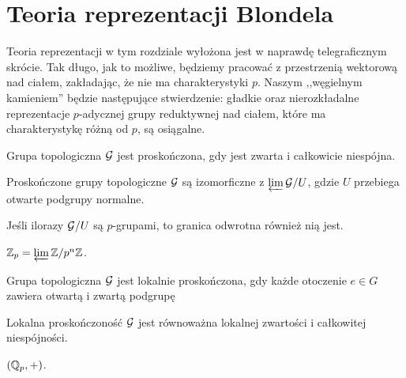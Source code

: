 \section{Teoria reprezentacji Blondela}
Teoria reprezentacji w tym rozdziale wyłożona jest w naprawdę telegraficznym skrócie.
Tak długo, jak to możliwe, będziemy pracować z przestrzenią wektorową nad ciałem, zakładając, że nie ma charakterystyki $p$.
Naszym ,,węgielnym kamieniem'' będzie następujące stwierdzenie: gładkie oraz nierozkładalne reprezentacje $p$-adycznej grupy reduktywnej nad ciałem, które ma charakterystykę różną od $p$, są osiągalne.

\begin{definicja}
	Grupa topologiczna $\mathcal G$ jest {proskończona}, gdy jest zwarta i całkowicie niespójna.
\end{definicja}

\begin{fakt}
	Proskończone grupy topologiczne $\mathcal G$ są izomorficzne z $\varprojlim \mathcal G / U$, gdzie $U$ przebiega otwarte podgrupy normalne.
\end{fakt}

\begin{fakt}
	Jeśli ilorazy $\mathcal G / U$ są $p$-grupami, to granica odwrotna również nią jest.
\end{fakt}

\begin{przyklad}
	$\mathbb Z_p = \varprojlim \mathbb Z / p^n \mathbb Z$.
\end{przyklad}

\begin{definicja}
	Grupa topologiczna $\mathcal G$ jest {lokalnie proskończona}, gdy każde otoczenie $e \in G$ zawiera otwartą i zwartą podgrupę
\end{definicja}

\begin{fakt}
	 Lokalna proskończoność $\mathcal G$ jest równoważna lokalnej zwartości i całkowitej niespójności.
\end{fakt}

\begin{przyklad}
	$(\mathbb Q_p, +)$.
\end{przyklad}

